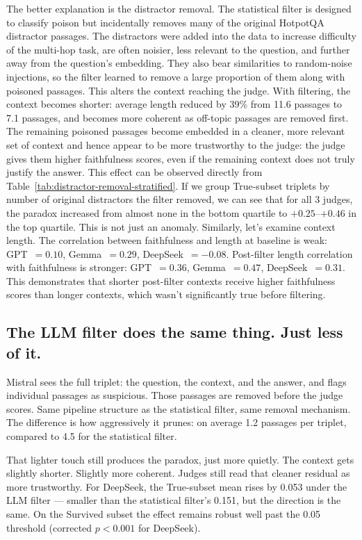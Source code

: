The better explanation is the distractor removal.
The statistical filter is designed to classify poison but incidentally removes many of the original HotpotQA distractor passages. The distractors were added into the data to increase difficulty of the multi-hop task, are often noisier, less relevant to the question, and further away from the question's embedding. They also bear similarities to random-noise injections, so the filter learned to remove a large proportion of them along with poisoned passages.
This alters the context reaching the judge. With filtering, the context becomes shorter: average length reduced by 39\% from 11.6 passages to 7.1 passages, and becomes more coherent as off-topic passages are removed first. The remaining poisoned passages become embedded in a cleaner, more relevant set of context and hence appear to be more trustworthy to the judge: the judge gives them higher faithfulness scores, even if the remaining context does not truly justify the answer.
This effect can be observed directly from Table~\ref{tab:distractor-removal-stratified}. If we group True-subset triplets by number of original distractors the filter removed, we can see that for all 3 judges, the paradox increased from almost none in the bottom quartile to $+0.25$--$+0.46$ in the top quartile. This is not just an anomaly.
Similarly, let's examine context length. The correlation between faithfulness and length at baseline is weak: GPT~$= 0.10$, Gemma~$= 0.29$, DeepSeek~$= -0.08$. Post-filter length correlation with faithfulness is stronger: GPT~$= 0.36$, Gemma~$= 0.47$, DeepSeek~$= 0.31$. This demonstrates that shorter post-filter contexts receive higher faithfulness scores than longer contexts, which wasn't significantly true before filtering.


\subsection{The LLM filter does the same thing. Just less of it.}

Mistral sees the full triplet: the question, the context, and the answer, and flags individual passages as suspicious. Those passages are removed before the judge scores. Same pipeline structure as the statistical filter, same removal mechanism. The difference is how aggressively it prunes: on average 1.2 passages per triplet, compared to 4.5 for the statistical filter.

That lighter touch still produces the paradox, just more quietly. The context gets slightly shorter. Slightly more coherent. Judges still read that cleaner residual as more trustworthy. For DeepSeek, the True-subset mean rises by 0.053 under the LLM filter --- smaller than the statistical filter's 0.151, but the direction is the same. On the Survived subset the effect remains robust well past the 0.05 threshold (corrected $p < 0.001$ for DeepSeek).

